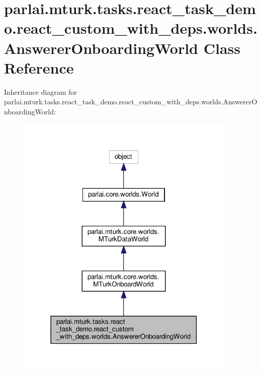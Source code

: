 \hypertarget{classparlai_1_1mturk_1_1tasks_1_1react__task__demo_1_1react__custom__with__deps_1_1worlds_1_1AnswererOnboardingWorld}{}\section{parlai.\+mturk.\+tasks.\+react\+\_\+task\+\_\+demo.\+react\+\_\+custom\+\_\+with\+\_\+deps.\+worlds.\+Answerer\+Onboarding\+World Class Reference}
\label{classparlai_1_1mturk_1_1tasks_1_1react__task__demo_1_1react__custom__with__deps_1_1worlds_1_1AnswererOnboardingWorld}


Inheritance diagram for parlai.\+mturk.\+tasks.\+react\+\_\+task\+\_\+demo.\+react\+\_\+custom\+\_\+with\+\_\+deps.\+worlds.\+Answerer\+Onboarding\+World\+:
\nopagebreak
\begin{figure}[H]
\begin{center}
\leavevmode
\includegraphics[width=297pt]{classparlai_1_1mturk_1_1tasks_1_1react__task__demo_1_1react__custom__with__deps_1_1worlds_1_1Ans103ec5e814edcb9878af02aa8122fae8}
\end{center}
\end{figure}


